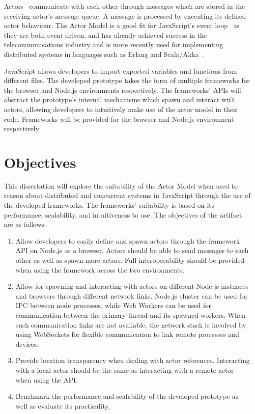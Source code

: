 \documentclass[lettersize,journal]{IEEEtran}
\begin{document}
Actors~\cite{hewitt1973session}\cite{43years} communicate with each other through messages which are stored in the receiving actor's message queue. A message is processed by executing its defined actor behaviour. The Actor Model is a good fit for JavaScript's event loop~\cite{eventloopbrowser}\cite{eventloopnode} as they are both event driven, and has already achieved success in the telecommunications industry and is more recently used for implementing distributed systems in languages such as Erlang and Scala/Akka~\cite{haller2012integration}.

JavaScript allows developers to import exported variables and functions from different files. The developed prototype takes the form of multiple frameworks for the browser and Node.js environments respectively. The frameworks' APIs will abstract the prototype's internal mechanisms which spawn and interact with actors, allowing developers to intuitively make use of the actor model in their code. Frameworks will be provided for the browser and Node.js environment respectively

\section{Objectives}
This dissertation will explore the suitability of the Actor Model when used to reason about distributed and concurrent systems in JavaScript through the use of the developed frameworks. The frameworks' suitability is based on its performance, scalability, and intuitiveness to use. The objectives of the artifact are as follows.
\begin{enumerate}
    \item Allow developers to easily define and spawn actors through the framework API on Node.js or a browser. Actors should be able to send messages to each other as well as spawn more actors. Full interoperability should be provided when using the framework across the two environments.
    \item Allow for spawning and interacting with actors on different Node.js instnaces and browsers through different network links. Node.js cluster\cite{cluster} can be used for IPC between node processes, while Web Workers\cite{webworkers} can be used for communication between the primary thread and its spawned workers. When such communication links are not available, the network stack is involved by using WebSockets for flexible communication to link remote processes and devices.
    \item Provide location transparency when dealing with actor references. Interacting with a local actor should be the same as interacting with a remote actor when using the API.
    \item Benchmark the performance and scalability of the developed prototype as well as evaluate its practicality.
\end{enumerate}
\end{document}
